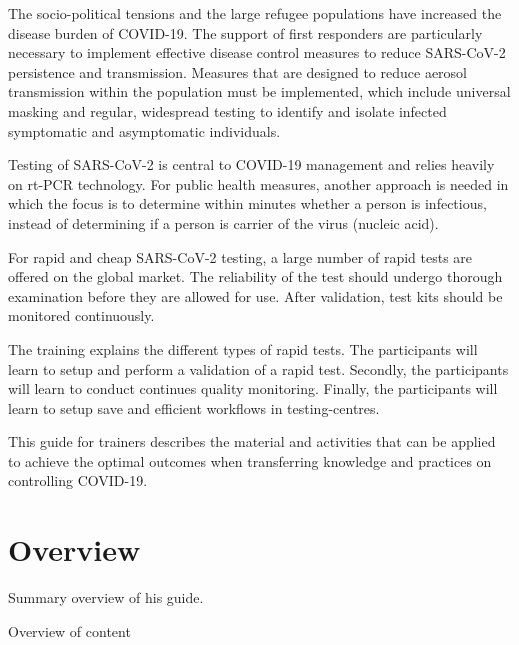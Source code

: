 \documentclass[
]{book}
\begin{document}
The socio-political tensions and the large refugee populations have increased the disease burden of COVID-19. The support of first responders are particularly
necessary to implement effective disease control measures to reduce
SARS-CoV-2 persistence and transmission. Measures that are designed to
reduce aerosol transmission within the population must be implemented,
which include universal masking and regular, widespread testing to
identify and isolate infected symptomatic and asymptomatic individuals.

Testing of SARS-CoV-2 is central to COVID-19 management and relies
heavily on rt-PCR technology. For public health measures, another
approach is needed in which the focus is to determine within minutes
whether a person is infectious, instead of determining if a person is
carrier of the virus (nucleic acid).

For rapid and cheap SARS-CoV-2 testing, a large number of rapid tests
are offered on the global market. The reliability of the test should
undergo thorough examination before they are allowed for use. After
validation, test kits should be monitored continuously.

The training explains the different types of rapid tests. The
participants will learn to setup and perform a validation of a rapid
test. Secondly, the participants will learn to conduct continues quality
monitoring. Finally, the participants will learn to setup save and
efficient workflows in testing-centres.

This guide for trainers describes the material and activities that can
be applied to achieve the optimal outcomes when transferring knowledge
and practices on controlling COVID-19.

\hypertarget{overview}{%
\chapter{Overview}\label{overview}}

Summary overview of his guide.

Overview of content
\end{document}
